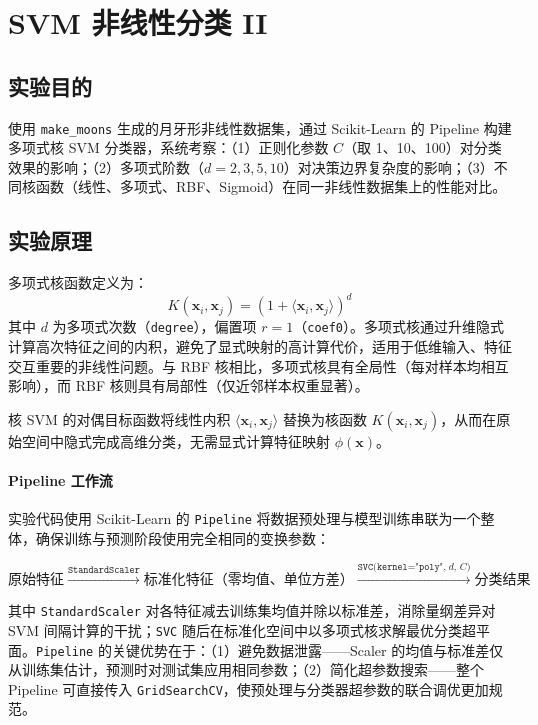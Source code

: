 \documentclass[10.5pt]{config}
\date{\today}
\begin{document}
\makeheader %

\section{SVM 非线性分类 II}

\subsection{实验目的}
使用 \texttt{make\_moons} 生成的月牙形非线性数据集，通过 Scikit-Learn 的 Pipeline 构建多项式核 SVM 分类器，系统考察：（1）正则化参数 $C$（取 1、10、100）对分类效果的影响；（2）多项式阶数（$d=2,3,5,10$）对决策边界复杂度的影响；（3）不同核函数（线性、多项式、RBF、Sigmoid）在同一非线性数据集上的性能对比。

\subsection{实验原理}
多项式核函数定义为：
$$K(\mathbf{x}_i, \mathbf{x}_j) = \left(1 + \langle\mathbf{x}_i, \mathbf{x}_j\rangle\right)^d$$
其中 $d$ 为多项式次数（\texttt{degree}），偏置项 $r=1$（\texttt{coef0}）。多项式核通过升维隐式计算高次特征之间的内积，避免了显式映射的高计算代价，适用于低维输入、特征交互重要的非线性问题。与 RBF 核相比，多项式核具有全局性（每对样本均相互影响），而 RBF 核则具有局部性（仅近邻样本权重显著）。

核 SVM 的对偶目标函数将线性内积 $\langle \mathbf{x}_i, \mathbf{x}_j\rangle$ 替换为核函数 $K(\mathbf{x}_i, \mathbf{x}_j)$，从而在原始空间中隐式完成高维分类，无需显式计算特征映射 $\phi(\mathbf{x})$。

\paragraph{Pipeline 工作流}
实验代码使用 Scikit-Learn 的 \texttt{Pipeline} 将数据预处理与模型训练串联为一个整体，确保训练与预测阶段使用完全相同的变换参数：

$$\text{原始特征}
  \xrightarrow{\texttt{StandardScaler}}
  \text{标准化特征（零均值、单位方差）}
  \xrightarrow{\texttt{SVC(kernel="poly",}\;d,\,C\texttt{)}}
  \text{分类结果}$$

其中 \texttt{StandardScaler} 对各特征减去训练集均值并除以标准差，消除量纲差异对 SVM 间隔计算的干扰；\texttt{SVC} 随后在标准化空间中以多项式核求解最优分类超平面。\texttt{Pipeline} 的关键优势在于：（1）避免数据泄露——Scaler 的均值与标准差仅从训练集估计，预测时对测试集应用相同参数；（2）简化超参数搜索——整个 Pipeline 可直接传入 \texttt{GridSearchCV}，使预处理与分类器超参数的联合调优更加规范。
\end{document}
